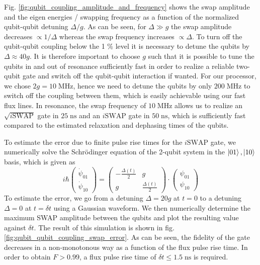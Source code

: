 Fig. \ref{fig:qubit_coupling_amplitude_and_frequency} shows the swap amplitude and the eigen energies / swapping frequency as a function of the normalized qubit-qubit detuning $\Delta/g$. As can be seen, for $\Delta \gg g$ the swap amplitude decreases $\propto 1/\Delta$ whereas the swap frequency increases $\propto \Delta$. To turn off the qubit-qubit coupling below the 1 \% level it is necessary to detune the qubits by $\Delta \approx 40 g$. It is therefore important to choose $g$ such that it is possible to tune the qubits in and out of resonance sufficiently fast in order to realize a reliable two-qubit gate and switch off the qubit-qubit interaction if wanted. For our processor, we chose $2g = 10\;\mathrm{MHz}$, hence we need to detune the qubits by only $200\;\mathrm{MHz}$ to switch off the coupling between them, which is easily achievable using our fast flux lines. In resonance, the swap frequency of $10\;\mathrm{MHz}$ allows us to realize an $\sqrt{i\mathrm{SWAP}}$ gate in $25\;\mathrm{ns}$ and an $i\mathrm{SWAP}$ gate in $50\;\mathrm{ns}$, which is sufficiently fast compared to the estimated relaxation and dephasing times of the qubits.

\smallskip

To estimate the error due to finite pulse rise times for the $i\mathrm{SWAP}$ gate, we numerically solve the Schrödinger equation of the 2-qubit system in the $\left| 01 \right>,\left| 10 \right>$ basis, which is given as
%
\begin{equation}
i\hbar\left(\begin{array}{c} \dot{\psi}_{01} \\ \dot{\psi}_{10} \end{array}\right) = \left( \begin{array}{cc} -\frac{\Delta(t)}{2} & g \\ g & \frac{\Delta(t)}{2}  \end{array} \right)\cdot \left(\begin{array}{c} \psi_{01} \\ \psi_{10} \end{array}\right) \label{eq:swap_evolution}
\end{equation}
%
To estimate the error, we go from a detuning $\Delta = 20 g$ at $t=0$ to a detuning $\Delta=0$ at $t=\delta t$ using a Gaussian waveform. We then numerically determine the maximum SWAP amplitude between the qubits and plot the resulting value against $\delta t$. The result of this simulation is shown in fig. \ref{fig:qubit_qubit_coupling_swap_error}. As can be seen, the fidelity of the gate decreases in a non-monotonous way as a function of the flux pulse rise time. In order to obtain $F>0.99$, a flux pulse rise time of $\delta t \le 1.5\;\mathrm{ns}$ is required.

